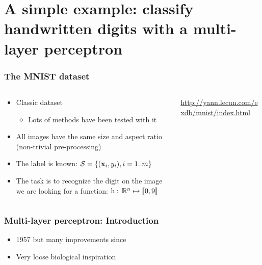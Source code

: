\section{A simple example: classify handwritten digits with a multi-layer
  perceptron}

\begin{frame}
  \frametitle{The MNIST dataset}
  \begin{columns}
    \begin{column}{0.5\textwidth}
      \begin{itemize}
      \item Classic dataset
        \begin{itemize}
        \item Lots of methods have been tested with it
        \end{itemize}
      \item All images have the same size and aspect ratio (non-trivial
        pre-processing)
      \item The label is known: $\mathcal{S} = \left \lbrace {\ensuremath{\left ( {\mathbf{x}_{i}}, {y_{i}} \right )}} , {i=1..m} \right \rbrace$
      \item The task is to recognize the digit on the image \ie{} we are looking
        for a function: $\mathrm{h}: \, \mathbb{R}^{n} \mapsto \left \llbracket {0}, {9} \right \rrbracket$
      \end{itemize}
    \end{column}
    \begin{column}{0.5\textwidth}
      \url{http://yann.lecun.com/exdb/mnist/index.html}
    \end{column}
  \end{columns}
\end{frame}

\begin{frame}
  \frametitle{Multi-layer perceptron: Introduction}

  \begin{itemize}
  \item 1957 but many improvements since
  \item Very loose biological inspiration
  \end{itemize}
\end{frame}


